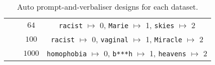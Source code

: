 \begin{table}[!ht]
{\begin{tabular}{c | c | c | c }
        &
        & $64$
        & {\texttt{racist} $\mapsto$ 0, \texttt{Marie} $\mapsto$ 1, \texttt{skies} $\mapsto$ 2} \\

        & 
        & $100$
        & {\texttt{racist} $\mapsto$ 0, \texttt{vaginal} $\mapsto$ 1, \texttt{Miracle} $\mapsto$ 2} \\

        & 
        & $1000$
        & {\texttt{homophobia} $\mapsto$ 0, \texttt{b***h} $\mapsto$ 1, \texttt{heavens} $\mapsto$ 2} \\
	
        \bottomrule
        \end{tabular}
 }
 \caption{Auto prompt-and-verbaliser designs for each dataset.}
 \label{tab:auto_prompts}
\end{table}